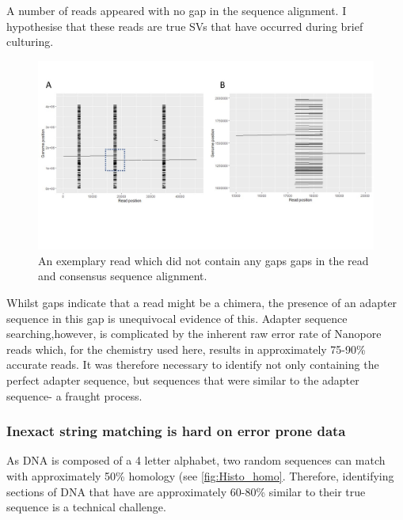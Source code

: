 \documentclass{article}
\begin{document}

A number of reads appeared with no gap in the sequence alignment. I hypothesise that these reads are true SVs that have occurred during brief culturing.
\begin{figure}[h!]
\centering
\includegraphics[width=\textwidth{}]{Chapter_2/Read 9(2).jpg}
\caption{An exemplary read which did not contain any gaps gaps in  the read and consensus sequence alignment.}
\label{fig:Gapless}
\end{figure}



Whilst gaps indicate that a read might be a chimera, the presence of an adapter sequence in this gap is unequivocal evidence of this. Adapter sequence searching,however, is complicated by the inherent raw error rate of Nanopore reads which, for the chemistry used here, results in approximately 75-90\% accurate reads. It was therefore necessary to identify not only containing the perfect adapter sequence, but sequences that were similar to the adapter sequence- a fraught process.

\subsubsection{Inexact string matching is hard on error prone data}

As DNA is composed of a 4 letter alphabet, two random sequences can match with approximately 50\% homology (see \ref{fig:Histo_homo}. Therefore, identifying sections of DNA that have are approximately 60-80\% similar to their true sequence is a technical challenge.
\end{document}
